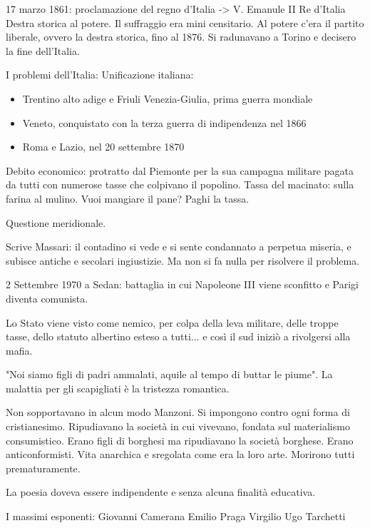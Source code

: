\documentclass{article}
\begin{document}
    17 marzo 1861: proclamazione del regno d'Italia -> V. Emanule II Re d'Italia
    Destra storica al potere. Il suffraggio era mini censitario. Al potere c'era il partito liberale, ovvero la destra storica, fino al 1876. Si radunavano a Torino e decisero la fine dell'Italia.

    I problemi dell'Italia:
    Unificazione italiana:

    \begin{itemize}
        \item Trentino alto adige e Friuli Venezia-Giulia, prima guerra mondiale
        \item Veneto, conquistato con la terza guerra di indipendenza nel 1866
        \item Roma e Lazio, nel 20 settembre 1870
    \end{itemize}

    Debito economico: protratto dal Piemonte per la sua campagna militare pagata da tutti con numerose tasse che colpivano il popolino. Tassa del macinato: sulla farina al mulino. Vuoi mangiare il pane? Paghi la tassa.

    Questione meridionale.

    Scrive Massari: il contadino si vede e si sente condannato a perpetua miseria, e subisce antiche e secolari ingiustizie. Ma non si fa nulla per risolvere il problema.

    2 Settembre 1970 a Sedan: battaglia in cui Napoleone III viene sconfitto e Parigi diventa comunista.

    Lo Stato viene visto come nemico, per colpa della leva militare, delle troppe tasse, dello statuto albertino esteso a tutti... e così il sud iniziò a rivolgersi alla mafia.

    "Noi siamo figli di padri ammalati, aquile al tempo di buttar le piume". La malattia per gli scapigliati è la tristezza romantica.

    Non sopportavano in alcun modo Manzoni. Si impongono contro ogni forma di cristianesimo. Ripudiavano la società in cui vivevano, fondata sul materialismo consumistico. Erano figli di borghesi ma ripudiavano la società borghese. Erano anticonformisti. Vita anarchica e sregolata come era la loro arte. Morirono tutti prematuramente.

    La poesia doveva essere indipendente e senza alcuna finalità educativa.

    I massimi esponenti:
    Giovanni Camerana
    Emilio Praga
    Virgilio Ugo Tarchetti
\end{document}
